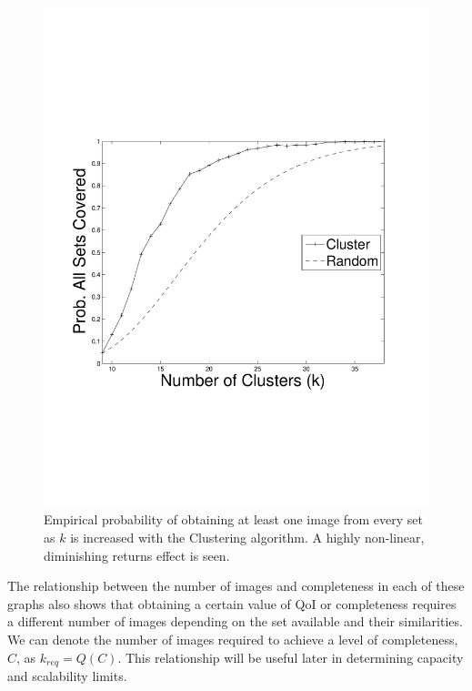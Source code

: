 \begin{figure} 
\begin{centering}
    \includegraphics[clip=true, trim = 15mm 65mm 20mm 70mm, scale=0.35]{figures/cluster/perc_all_sets_covered_vary_k.pdf}
    \vspace{-3mm}
    \caption{Empirical probability of obtaining at least one image from every set as $k$ is increased with the Clustering algorithm.  A highly non-linear, diminishing returns effect is seen.}
    \label{fig:clusterAvgNumSetsCov}
    \vspace{-7mm}
\end{centering}
\end{figure}

The relationship between the number of images and completeness in each of these graphs also shows that obtaining a certain value of QoI or completeness requires a different number of images depending on the set available and their similarities.  We can denote the number of images required to achieve a level of completeness, $C$, as $k_{req} = Q(C)$.  This relationship will be useful later in determining capacity and scalability limits.

